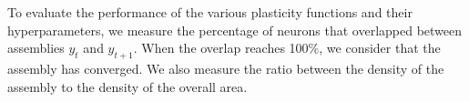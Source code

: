 \documentclass{article}
\begin{document}
To evaluate the performance of the various plasticity functions and their hyperparameters, we measure the percentage of neurons that overlapped between assemblies $y_t$ and $y_{t+1}$. When the overlap reaches 100\%, we consider that the assembly has converged. We also measure the ratio between the density of the assembly to the density of the overall area.
\end{document}

